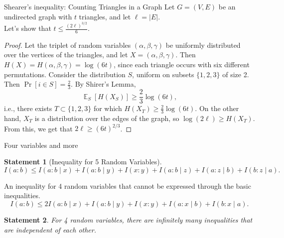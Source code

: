 \documentclass[handout,aspectratio=169]{beamer}
\newtheorem{statement}{Statement}
\DeclareMathOperator*{\E}{\mathbb{E}}
\begin{document}
    \begin{frame}{Shearer's inequality: Counting Triangles in a Graph}
		    Let \(G = (V, E)\) be an undirected graph with \(t\) triangles, and let \(\ell = |E|\).\\
		    Let's show that \(t \le \frac{(2\ell)^{3/2}}{6}\).
		    \pause \begin{proof}
		        Let the triplet of random variables \((\alpha, \beta, \gamma)\) be uniformly distributed over the vertices of the triangles, and let \(X = (\alpha, \beta, \gamma)\). Then \(H(X) = H(\alpha, \beta, \gamma) = \log(6t)\), since each triangle occurs with six different permutations. Consider the distribution \(S\), uniform on subsets \(\{1, 2, 3\}\) of size 2. Then \(\Pr[i \in S] = \frac{2}{3}\). By Shirer's Lemma,
		    \[
		        \E_S[H(X_S)] \ge \frac{2}{3} \log(6t),
		    \]
		    i.e., there exists \(T \subset \{1, 2, 3\}\) for which \(H(X_T) \ge \frac{2}{3} \log(6t)\).
		    On the other hand, \(X_T\) is a distribution over the edges of the graph, so \(\log(2\ell) \ge H(X_T)\). From this, we get that \(2\ell \ge (6t)^{2/3}\).
		    \end{proof}

    \end{frame}

    \begin{frame}{Four variables and more}
		\begin{statement}[Inequality for 5 Random Variables]
		    $
		        I(a : b) \le I(a : b \mid x) + I(a : b \mid y) + I(x : y)
		        + I(a : b \mid z) + I(a : z \mid b) + I(b : z \mid a).
		    $
		\end{statement}
		\begin{corollary}
		    An inequality for 4 random variables that cannot be expressed through the basic inequalities.
		    \[
		        I(a : b) \le 2I(a : b \mid x) + I(a : b \mid y) + I(x : y)
		        + I(a : x \mid b) + I(b : x \mid a).
		    \]
		\end{corollary}
		\begin{statement}
		    For 4 random variables, there are infinitely many inequalities that are independent of each other.
		\end{statement}
		
    \end{frame}
\end{document}
